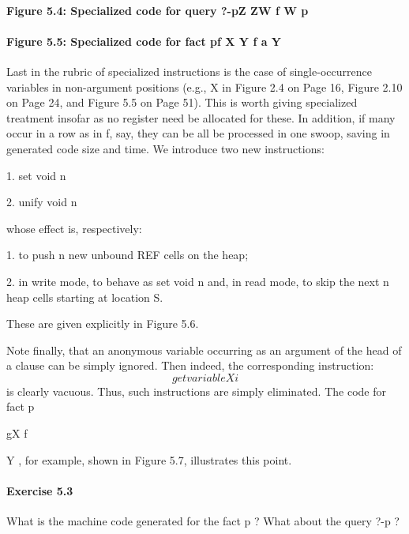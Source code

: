 \paragraph{Figure 5.4: Specialized code for query ?-pZ
ZW
f W
p}

\paragraph{Figure 5.5: Specialized code for fact pf
X
Y
f a
Y }

Last in the rubric of specialized instructions is the case of single-occurrence variables
in non-argument positions (e.g., X in Figure 2.4 on Page 16, Figure 2.10 on
Page 24, and Figure 5.5 on Page 51). This is worth giving specialized treatment
insofar as no register need be allocated for these. In addition, if many occur in
a row as in f, say, they can be all be processed in one swoop, saving in
generated code size and time. We introduce two new instructions:

1. set void n

2. unify void n

whose effect is, respectively:

1. to push n new unbound REF cells on the heap;

2. in write mode, to behave as set void n and, in read mode, to skip the
next n heap cells starting at location S.

These are given explicitly in Figure 5.6.

Note finally, that an anonymous variable occurring as an argument of the head of
a clause can be simply ignored. Then indeed, the corresponding instruction:
\[get variable Xi\]
is clearly vacuous. Thus, such instructions are simply eliminated. The code for
fact p

gX
f

Y
, for example, shown in Figure 5.7, illustrates this point.

\paragraph{Exercise 5.3} What is the machine code generated for the fact p  
? What about the query ?-p   ?
